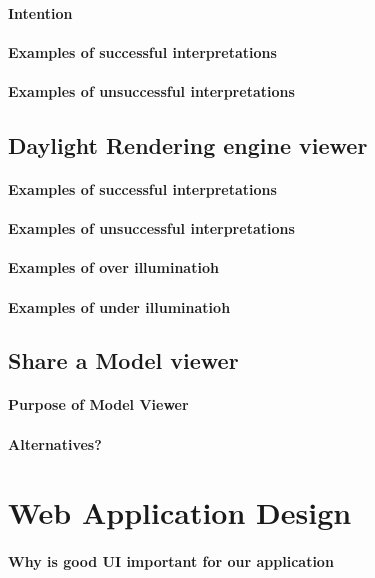 \paragraph{Intention}
\paragraph{Examples of successful interpretations}
\paragraph{Examples of unsuccessful interpretations}

\subsection{Daylight Rendering engine viewer}
\paragraph{Examples of successful interpretations}
\paragraph{Examples of unsuccessful interpretations}
\paragraph{Examples of over illuminatioh}
\paragraph{Examples of under illuminatioh}

\subsection{Share a Model viewer}
\paragraph{Purpose of Model Viewer}
\paragraph{Alternatives?}

\section{Web Application Design}
\paragraph{Why is good UI important for our application}
